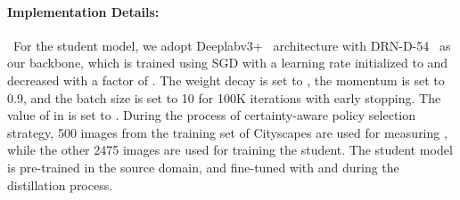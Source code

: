 \documentclass[final]{cvpr}
\begin{document}
\paragraph{Implementation Details:}~For the student model, we adopt Deeplabv3+~\cite{chen2018encoder} architecture with DRN-D-54~\cite{yu2017dilated} as our backbone, which is trained using SGD with a learning rate initialized to  and decreased with a factor of . The weight decay is set to , the momentum is set to 0.9, and the batch size is set to 10 for 100K iterations with early stopping. The value of  in  is set to . During the process of certainty-aware policy selection strategy, 500 images from the training set of Cityscapes are used for measuring , while the other 2475 images are used for training the student. The student model is pre-trained in the source domain, and fine-tuned with  and  during the distillation process.
\end{document}
